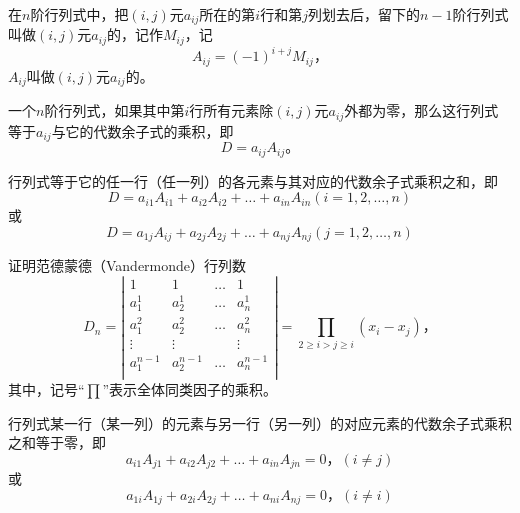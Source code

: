 \begin{定义}
	在$ n $阶行列式中，把$ (i,j) $元$ a_{ij} $所在的第$ i $行和第$ j $列划去后，留下的$ n-1 $阶行列式叫做$ (i,j) $元$ a_{ij} $的，记作$ M_{ij} $，记
	\begin{equation}
		A_{ij} = (-1)^{i+j}M_{ij}\text{，}
	\end{equation}
	\noindent $ A_{ij} $叫做$ (i,j) $元$ a_{ij} $的。
\end{定义}

\begin{引理}
	一个$ n $阶行列式，如果其中第$ i $行所有元素除$ (i,j) $元$ a_{ij} $外都为零，那么这行列式等于$ a_{ij} $与它的代数余子式的乘积，即
	\begin{equation}
		D = a_{ij}A_{ij}\text{。}
	\end{equation}
\end{引理}

\begin{定理}
	行列式等于它的任一行（任一列）的各元素与其对应的代数余子式乘积之和，即
	\begin{equation}
		D = a_{i1}A_{i1} + a_{i2}A_{i2} + \dots + a_{in}A_{in} (i=1,2,\dots,n) 
	\end{equation}
	或
	\begin{equation}
		D = a_{1j}A_{ij} + a_{2j}A_{2j} + \dots + a_{nj}A_{nj} (j=1,2,\dots,n) 
	\end{equation}
\end{定理}

证明范德蒙德（Vandermonde）行列数
\begin{equation}\label{VandermondeDeterminant}
	D_{n}=\left |\begin{array}{cccc}
	1 & 1 & \dots & 1\\
	a_{1}^{1} & a_{2}^{1} & \dots & a_{n}^{1}\\
	a_{1}^{2} & a_{2}^{2} & \dots & a_{n}^{2}\\
	\vdots & \vdots & & \vdots \\
	a_{1}^{n-1} & a_{2}^{n-1} & \dots & a_{n}^{n-1}\\
	\end{array}\right | = \prod_{2 \geqslant i > j \geqslant i}(x_{i} - x_{j})\text{，}
\end{equation}
其中，记号``$ \prod $''表示全体同类因子的乘积。

\begin{推论}
	行列式某一行（某一列）的元素与另一行（另一列）的对应元素的代数余子式乘积之和等于零，即
	\begin{equation}
		a_{i1}A_{j1} + a_{i2}A_{j2} + \dots + a_{in}A_{jn} = 0 \text{，} (i \ne j) 
	\end{equation}
	或
	\begin{equation}
		a_{1i}A_{1j} + a_{2i}A_{2j} + \dots + a_{ni}A_{nj} = 0 \text{，} (i \ne i) 
	\end{equation}
\end{推论}






